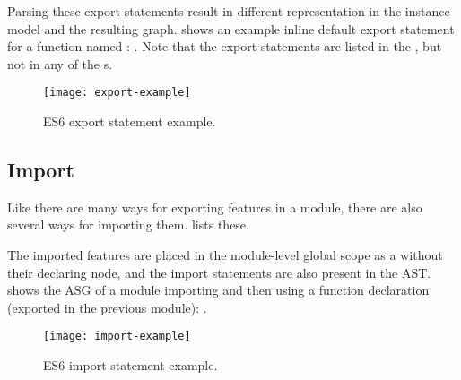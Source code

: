 \begin{figure}[htbp]
	\begin{minipage}{\textwidth}
		
	\end{minipage}
\end{figure}

Parsing these export statements result in different representation in the instance model and the resulting graph.  shows an example inline default export statement for a function named : . Note that the export statements are listed in the , but not in any of the s.

\begin{figure}[htbp]
  \centering
  \texttt{[image: export-example]}
  \caption{ES6 export statement example.}
  \label{fig:es6-export-example}
\end{figure}


\subsection{Import}
Like there are many ways for exporting features in a module, there are also several ways for importing them.  lists these.

\begin{figure}[htbp]
	\begin{minipage}{\textwidth}
		
	\end{minipage}
\end{figure}

The imported features are placed in the module-level global scope as a  without their declaring node, and the import statements are also present in the AST.  shows the ASG of a module importing and then using a function declaration (exported in the previous module): .

\begin{figure}[htbp]
  \centering
  \texttt{[image: import-example]}
  \caption{ES6 import statement example.}
  \label{fig:es6-import-example}
\end{figure}

